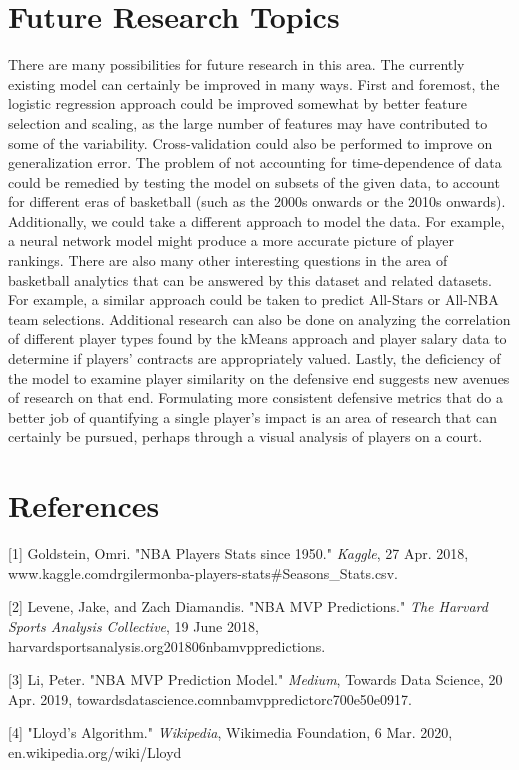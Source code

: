 \documentclass{article}
\begin{document}
\section{\Large Future Research Topics}

There are many possibilities for future research in this area. The currently existing model can certainly be improved in many ways. First and foremost, the logistic regression approach could be improved somewhat by better feature selection and scaling, as the large number of features may have contributed to some of the variability. Cross-validation could also be performed to improve on generalization error. The problem of not accounting for time-dependence of data could be remedied by testing the model on subsets of the given data, to account for different eras of basketball (such as the 2000s onwards or the 2010s onwards). Additionally, we could take a different approach to model the data. For example, a neural network model might produce a more accurate picture of player rankings. There are also many other interesting questions in the area of basketball analytics that can be answered by this dataset and related datasets. For example, a similar approach could be taken to predict All-Stars or All-NBA team selections.  Additional research can also be done on analyzing the correlation of different player types found by the kMeans approach and player salary data to determine if players' contracts are appropriately valued. Lastly, the deficiency of the model to examine player similarity on the defensive end suggests new avenues of research on that end. Formulating more consistent defensive metrics that do a better job of quantifying a single player's impact is an area of research that can certainly be pursued, perhaps through a visual analysis of players on a court.

\section*{References}


[1] Goldstein, Omri. "NBA Players Stats since 1950." {\it Kaggle}, 27 Apr. 2018, www.kaggle.com\/drgilermo\/nba-players-stats\#Seasons\_Stats.csv.

[2] Levene, Jake, and Zach Diamandis. "NBA MVP Predictions." {\it The Harvard Sports Analysis Collective}, 19 June 2018, harvardsportsanalysis.org\/2018\/06\/nba\-mvp\-predictions\/.

[3] Li, Peter. "NBA MVP Prediction Model." {\it Medium}, Towards Data Science, 20 Apr. 2019, towardsdatascience.com\/nba\-mvp\-predictor\-c700e50e0917.

[4] "Lloyd's Algorithm." {\it Wikipedia}, Wikimedia Foundation, 6 Mar. 2020, en.wikipedia.org/wiki/Lloyd%
\end{document}
